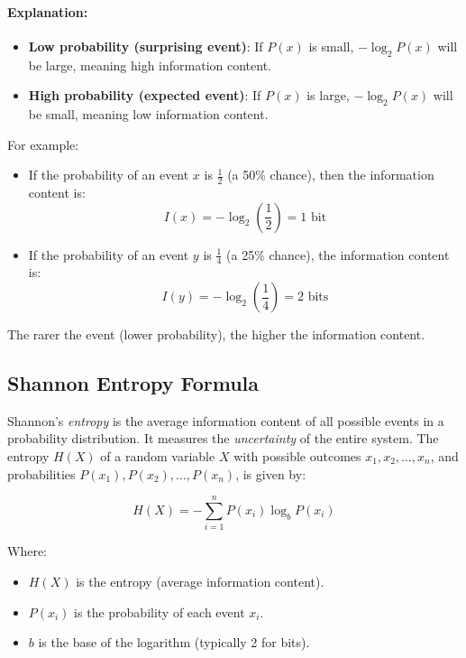 \documentclass[12pt]{article}
\begin{document}
\paragraph{Explanation:}
\begin{itemize}
    \item \textbf{Low probability (surprising event)}: If \( P(x) \) is small, \( -\log_2 P(x) \) will be large, meaning high information content.
    \item \textbf{High probability (expected event)}: If \( P(x) \) is large, \( -\log_2 P(x) \) will be small, meaning low information content.
\end{itemize}

For example:
\begin{itemize}
    \item If the probability of an event \( x \) is \( \frac{1}{2} \) (a 50\% chance), then the information content is:
    \[
    I(x) = -\log_2\left(\frac{1}{2}\right) = 1 \text{ bit}
    \]
    \item If the probability of an event \( y \) is \( \frac{1}{4} \) (a 25\% chance), the information content is:
    \[
    I(y) = -\log_2\left(\frac{1}{4}\right) = 2 \text{ bits}
    \]
\end{itemize}
The rarer the event (lower probability), the higher the information content.

\subsection{Shannon Entropy Formula}

Shannon's \textit{entropy} is the average information content of all possible events in a probability distribution. It measures the \textit{uncertainty} of the entire system. The entropy \( H(X) \) of a random variable \( X \) with possible outcomes \( x_1, x_2, \dots, x_n \), and probabilities \( P(x_1), P(x_2), \dots, P(x_n) \), is given by:

\[
H(X) = - \sum_{i=1}^{n} P(x_i) \log_b P(x_i)
\]

Where:
\begin{itemize}
    \item \( H(X) \) is the entropy (average information content).
    \item \( P(x_i) \) is the probability of each event \( x_i \).
    \item \( b \) is the base of the logarithm (typically 2 for bits).
\end{itemize}
\end{document}
